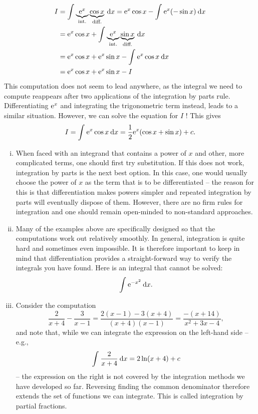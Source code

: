 \begin{example}
\begin{enumerate}[(i)]
\begin{equation*}
	\begin{split}
	I & = \int_{}^{} \underbrace{\mathrm{e}^x}_{\text{int.}}\underbrace{\cos x}_{\text{diff.}} \: \mathrm{d} x 
	= \mathrm{e}^x\cos x - \int_{}^{} \mathrm{e}^x (-\sin x) \: \mathrm{d} x \\
	& = \mathrm{e}^x\cos x + \int_{}^{} \underbrace{\mathrm{e}^x}_{\text{int.}}\underbrace{\sin x}_{\text{diff.}} \: \mathrm{d} x \\
	& = \mathrm{e}^x\cos x + \mathrm{e}^x\sin x - \int_{}^{} \mathrm{e}^x \cos x \: \mathrm{d} x \\
	& = \mathrm{e}^x\cos x + \mathrm{e}^x\sin x - I
	\end{split}
	\end{equation*}
	This computation does not seem to lead anywhere, as the integral we need to compute reappears after two applications of the integration by parts rule. Differentiating $\mathrm{e}^x$ and integrating the trigonometric term instead, leads to a similar situation. However, we can solve the equation for $I$ ! This gives
	\[ I = \int_{}^{} \mathrm{e}^x \cos x \: \mathrm{d} x = \frac12 \mathrm{e}^x(\cos x + \sin x) +c.\]
\end{enumerate}
\end{example}

\begin{remark}
\begin{enumerate}[(i)]
	\item When faced with an integrand that contains a power of $x$ and other, more complicated terms, one should first try substitution. If this does not work, integration by parts is the next best option. In this case, one would usually choose the power of $x$ as the term that is to be differentiated -- the reason for this is that differentiation makes powers simpler and repeated integration by parts will eventually dispose of them. However, there are no firm rules for integration and one should remain open-minded to non-standard approaches.
	\item Many of the examples above are specifically designed so that the computations work out relatively smoothly. In general, integration is quite hard and sometimes even impossible. It is therefore important to keep in mind that differentiation provides a straight-forward way to verify the integrals you have found. Here is an integral that cannot be solved:
	\[ \int_{}^{} \mathrm{e}^{-x^2} \: \mathrm{d} x. \]
	\item Consider the computation
	\[ \frac{2}{x+4}-\frac{3}{x-1} 
	= \frac{2(x-1)-3(x+4)}{(x+4)(x-1)} = \frac{-(x+14)}{x^2+3x-4}, \]
	and note that, while we can integrate the expression on the left-hand side -- e.g.,
	\[ \int_{}^{} \frac{2}{x+4} \: \mathrm{d} x = 2\ln(x+4) + c \]
	-- the expression on the right is not covered by the integration methods we have developed so far. Reversing finding the common denominator therefore extends the set of functions we can integrate. This is called integration by partial fractions.
\end{enumerate}
\end{remark}

